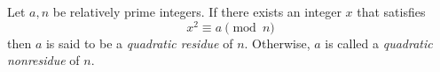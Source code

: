 \documentclass[12pt]{article}
\begin{document}
Let $a,n$ be relatively prime integers. If there exists an integer $x$ that satisfies $$x^2 \equiv a \pmod{n}$$ then $a$ is said to be a \emph{quadratic residue} of $n$.  Otherwise, $a$ is called a \emph{quadratic nonresidue} of $n$.
\end{document}
